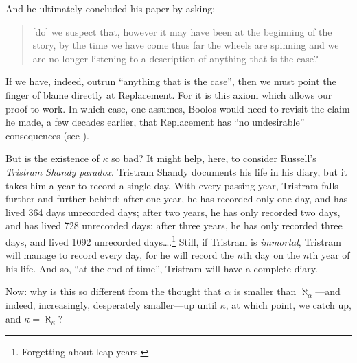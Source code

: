 \documentclass[../../../include/open-logic-section]{subfiles}
\begin{document}
And he ultimately concluded his paper by asking:
\begin{quote}
	[do] we  suspect that,  however  it  may  have  been  at  the  beginning  of  the  story,  by  the  time  we have come thus  far  the wheels  are  spinning  and  we  are no longer  listening  to  a description  of  anything  that  is the case? \citep[268]{Boolos2000}
\end{quote}
If we have, indeed, outrun ``anything that is the case'', then we must point the finger of blame directly at Replacement. For it is this axiom which allows our proof to work. In which case, one assumes, Boolos would need to revisit the claim he made, a few decades earlier, that Replacement has ``no undesirable'' consequences (see ).

But is the existence of $\kappa$ so bad? It might help, here, to consider Russell's \emph{Tristram Shandy paradox}. Tristram Shandy documents his life in his diary, but it takes him a year to record a single day. With every passing year, Tristram falls further and further behind: after one year, he has recorded only one day, and has lived 364 days unrecorded days; after two years, he has only recorded two days, and has lived 728 unrecorded days; after three years, he has only recorded three days, and lived 1092 unrecorded days\ldots.\footnote{Forgetting about leap years.} Still, if Tristram is \emph{immortal}, Tristram will manage to record every day, for he will record the $n$th day on the $n$th year of his life. And so, ``at the end of time'', Tristram will have a complete diary. 

Now: why is this so different from the thought that $\alpha$ is smaller than $\aleph_\alpha$---and indeed, increasingly, desperately smaller---up until $\kappa$, at which point, we catch up, and $\kappa = \aleph_\kappa$?
\end{document}
